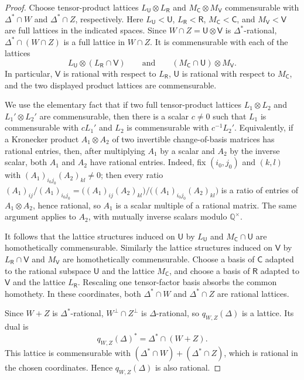 \documentclass[reqno,11pt]{amsart}
\numberwithin{equation}{section}
\theoremstyle{definition}
\theoremstyle{remark}
\begin{document}
\begin{proof}
Choose tensor-product lattices $L_{\mathsf U}\otimes L_{\mathsf R}$ and
$M_{\mathsf C}\otimes M_{\mathsf V}$ commensurable with $\Delta^*\cap W$ and
$\Delta^*\cap Z$, respectively. Here $L_{\mathsf U}<\mathsf U$,
$L_{\mathsf R}<\mathsf R$, $M_{\mathsf C}<\mathsf C$, and $M_{\mathsf V}<\mathsf V$ are
full lattices in the indicated spaces. Since
$W\cap Z=\mathsf U\otimes\mathsf V$ is $\Delta^*$-rational, $\Delta^*\cap(W\cap Z)$ is a
full lattice in $W\cap Z$. It is commensurable with each of the lattices
$$
L_{\mathsf U}\otimes(L_{\mathsf R}\cap\mathsf V)
\qquad\text{and}\qquad
(M_{\mathsf C}\cap\mathsf U)\otimes M_{\mathsf V}.
$$
In particular, $\mathsf V$ is rational with respect to $L_{\mathsf R}$, $\mathsf U$ is
rational with respect to $M_{\mathsf C}$, and the two displayed
product lattices are commensurable.

We use the elementary fact that if two full tensor-product lattices
$L_1\otimes L_2$ and $L_1'\otimes L_2'$ are commensurable, then there is a
scalar $c\ne0$ such that $L_1$ is commensurable with $cL_1'$ and
$L_2$ is commensurable with $c^{-1}L_2'$.
Equivalently, if a Kronecker product $A_1\otimes A_2$ of two invertible change-of-basis matrices has rational entries, then, after multiplying $A_1$ by a scalar and $A_2$ by the inverse scalar, both $A_1$ and $A_2$ have rational entries. Indeed, fix $(i_0,j_0)$ and $(k,l)$ with $(A_1)_{i_0j_0}(A_2)_{kl}\ne0$; then every ratio $(A_1)_{ij}/(A_1)_{i_0j_0}=\bigl((A_1)_{ij}(A_2)_{kl}\bigr)\big/\bigl((A_1)_{i_0j_0}(A_2)_{kl}\bigr)$ is a ratio of entries of $A_1\otimes A_2$, hence rational, so $A_1$ is a scalar multiple of a rational matrix. The same argument applies to $A_2$, with mutually inverse scalars modulo $\mathbb Q^\times$.

It follows that the lattice structures induced on $\mathsf U$ by $L_{\mathsf U}$ and
$M_{\mathsf C}\cap \mathsf U$ are homothetically commensurable.  Similarly the
lattice structures induced on $\mathsf V$ by $L_{\mathsf R}\cap\mathsf V$ and $M_{\mathsf V}$
are homothetically commensurable. Choose a basis of $\mathsf C$ adapted to
the rational subspace $\mathsf U$ and the lattice $M_{\mathsf C}$, and choose a
basis of $\mathsf R$ adapted to $\mathsf V$ and the lattice $L_{\mathsf R}$.
Rescaling one tensor-factor basis absorbs the common homothety. In these
coordinates, both $\Delta^*\cap W$ and $\Delta^*\cap Z$ are rational
lattices.

Since $W+Z$ is $\Delta^*$-rational,
$W^\perp\cap Z^\perp$ is $\Delta$-rational, so
$q_{W,Z}(\Delta)$ is a lattice. Its dual is
$$
q_{W,Z}(\Delta)^*=\Delta^*\cap(W+Z).
$$
This lattice is commensurable with
$(\Delta^*\cap W)+(\Delta^*\cap Z)$,
which is rational in the chosen coordinates. Hence
$q_{W,Z}(\Delta)$ is also rational.
\end{proof}
\end{document}
